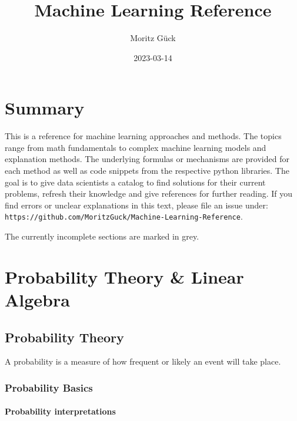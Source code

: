 \documentclass[
]{book}
\title{Machine Learning Reference}
\author{Moritz Gück}
\date{2023-03-14}
\begin{document}
\maketitle

{
\setcounter{tocdepth}{1}
\tableofcontents
}
\hypertarget{summary}{%
\chapter*{Summary}\label{summary}}

This is a reference for machine learning approaches and methods. The
topics range from math fundamentals to complex machine learning models
and explanation methods. The underlying formulas or mechanisms are provided for each method as
well as code snippets from the respective python libraries. The goal is to give data scientists a
catalog to find solutions for their current problems, refresh their knowledge and give references for further reading. If you
find errors or unclear explanations in this text, please file an issue
under: \texttt{https://github.com/MoritzGuck/Machine-Learning-Reference}.

The currently incomplete sections are marked in grey.

\hypertarget{probability-theory-linear-algebra}{%
\chapter{Probability Theory \& Linear Algebra}\label{probability-theory-linear-algebra}}

\hypertarget{probability-theory}{%
\section{Probability Theory}\label{probability-theory}}

A probability is a measure of how frequent or likely an event will take
place.

\hypertarget{probability-basics}{%
\subsection{Probability Basics}\label{probability-basics}}

\hypertarget{probability-interpretations}{%
\subsubsection{Probability interpretations}\label{probability-interpretations}}
\end{document}

